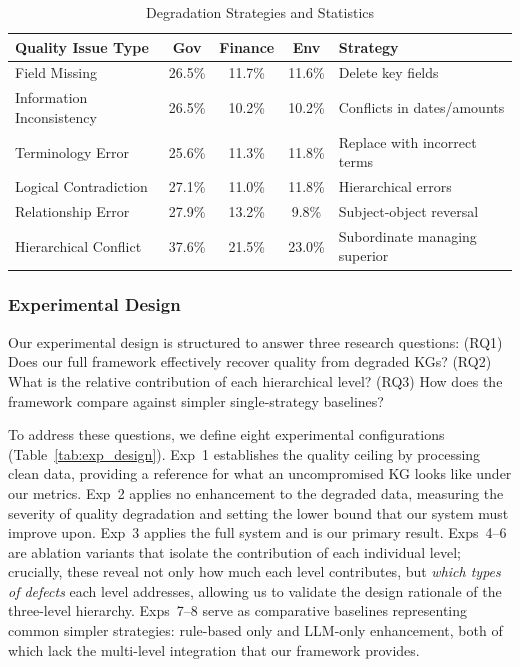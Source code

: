 \documentclass[runningheads]{llncs}
\begin{document}
\begin{table}[H]
    \centering
    \caption{Degradation Strategies and Statistics}
    \label{tab:degradation_stats}
    \begin{tabularx}{\textwidth}{l c c c X}
    \toprule
    Quality Issue Type & Gov & Finance & Env & Strategy \\
    \midrule
    Field Missing & 26.5\% & 11.7\% & 11.6\% & Delete key fields \\
    Information Inconsistency & 26.5\% & 10.2\% & 10.2\% & Conflicts in dates/amounts \\
    Terminology Error & 25.6\% & 11.3\% & 11.8\% & Replace with incorrect terms \\
    Logical Contradiction & 27.1\% & 11.0\% & 11.8\% & Hierarchical errors \\
    Relationship Error & 27.9\% & 13.2\% & 9.8\% & Subject-object reversal \\
    Hierarchical Conflict & 37.6\% & 21.5\% & 23.0\% & Subordinate managing superior \\
    \bottomrule
    \end{tabularx}
\end{table}

\subsubsection{Experimental Design}
Our experimental design is structured to answer three research questions: (RQ1) Does our full framework effectively recover quality from degraded KGs? (RQ2) What is the relative contribution of each hierarchical level? (RQ3) How does the framework compare against simpler single-strategy baselines?

To address these questions, we define eight experimental configurations (Table~\ref{tab:exp_design}). Exp~1 establishes the quality ceiling by processing clean data, providing a reference for what an uncompromised KG looks like under our metrics. Exp~2 applies no enhancement to the degraded data, measuring the severity of quality degradation and setting the lower bound that our system must improve upon. Exp~3 applies the full system and is our primary result. Exps~4--6 are ablation variants that isolate the contribution of each individual level; crucially, these reveal not only how much each level contributes, but \textit{which types of defects} each level addresses, allowing us to validate the design rationale of the three-level hierarchy. Exps~7--8 serve as comparative baselines representing common simpler strategies: rule-based only and LLM-only enhancement, both of which lack the multi-level integration that our framework provides.
\end{document}
